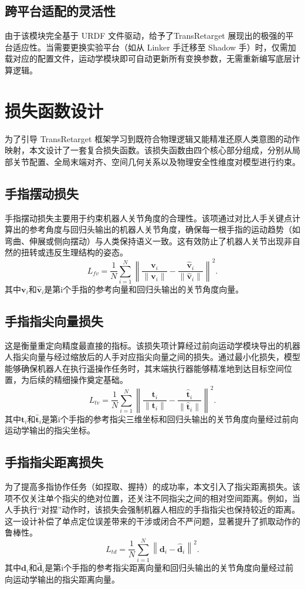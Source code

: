 \subsection{跨平台适配的灵活性}
由于该模块完全基于 URDF 文件驱动，给予了TransRetarget 展现出的极强的平台适应性。当需要更换实验平台（如从 Linker 手迁移至 Shadow 手）时，仅需加载对应的配置文件，运动学模块即可自动更新所有变换参数，无需重新编写底层计算逻辑。

\section{损失函数设计}
为了引导 TransRetarget 框架学习到既符合物理逻辑又能精准还原人类意图的动作映射，本文设计了一套复合损失函数。该损失函数由四个核心部分组成，分别从局部关节配置、全局末端对齐、空间几何关系以及物理安全性维度对模型进行约束。

\subsection{手指摆动损失}
手指摆动损失主要用于约束机器人关节角度的合理性。该项通过对比人手关键点计算出的参考角度与回归头输出的机器人关节角度，确保每一根手指的运动趋势（如弯曲、伸展或侧向摆动）与人类保持语义一致。这有效防止了机器人关节出现非自然的扭转或违反生理结构的姿态。
\begin{equation}
L_{fv} = \frac{1}{N}\sum_{i=1}^{N} \left\| \frac{\mathbf{v}_{i}}{\|\mathbf{v}_{i}\|} - \frac{\hat{\mathbf{v}}_{i}}{\|\hat{\mathbf{v}}_{i}\|} \right\|^2.
\end{equation}
其中$\mathbf{v}_{i}$和$\hat{\mathbf{v}}_{i}$是第i个手指的参考向量和回归头输出的关节角度向量。
\subsection{手指指尖向量损失}
这是衡量重定向精度最直接的指标。该损失项计算经过前向运动学模块导出的机器人指尖向量与经过缩放后的人手对应指尖向量之间的损失。通过最小化损失，模型能够确保机器人在执行遥操作任务时，其末端执行器能够精准地到达目标空间位置，为后续的精细操作奠定基础。
\begin{equation}
L_{tv} = \frac{1}{N}\sum_{i=1}^{N} \left\| \frac{\mathbf{t}_{i}}{\|\mathbf{t}_{i}\|} - \frac{\hat{\mathbf{t}}_{i}}{\|\hat{\mathbf{t}}_{i}\|} \right\|^2.
\end{equation}
其中$\mathbf{t}_{i}$和$\hat{\mathbf{t}}_{i}$是第i个手指的参考指尖三维坐标和回归头输出的关节角度向量经过前向运动学输出的指尖坐标。
\subsection{手指指尖距离损失}
为了提高多指协作任务（如捏取、握持）的成功率，本文引入了指尖距离损失。该项不仅关注单个指尖的绝对位置，还关注不同指尖之间的相对空间距离。例如，当人手执行“对捏”动作时，该损失会强制机器人相应的手指指尖也保持较近的距离。这一设计补偿了单点定位误差带来的干涉或闭合不严问题，显著提升了抓取动作的鲁棒性。
\begin{equation}
L_{td} = \frac{1}{N}\sum_{i=1}^{N} \left\| \mathbf{d}_{i} - \hat{\mathbf{d}}_{i} \right\|^2.
\end{equation}
其中$\mathbf{d}_{i}$和$\hat{\mathbf{d}}_{i}$是第i个手指的参考指尖距离向量和回归头输出的关节角度向量经过前向运动学输出的指尖距离向量。

